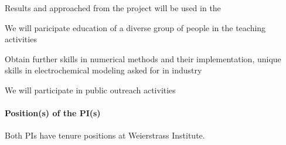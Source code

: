 \documentclass[a4paper,10pt]{article}
\begin{document}
Results and approached from the project will be used in the 

We will paricipate education of a diverse group of people in the teaching activities

Obtain further skills in numerical methods and their implementation, unique skills in electrochemical
modeling asked for in  industry

We will participate in public outreach activities

\paragraph{Position(s) of the PI(s)}
Both PIs have tenure positions at Weierstrass Institute.
\end{document}
